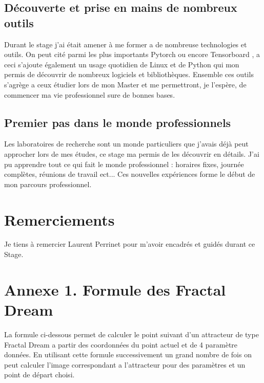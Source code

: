 \documentclass[11pt,francais]{article}
\begin{document}
\subsection{Découverte et prise en mains de nombreux outils}
Durant le stage j'ai était amener à me former a de nombreuse technologies et outils.
On peut cité parmi les plus importants Pytorch \cite{paszke2017automatic} ou encore Tensorboard \cite{tensorflow2015-whitepaper}, a ceci s'ajoute également un usage quotidien de Linux et de Python qui mon permis de découvrir de nombreux logiciels et bibliothèques.
Ensemble ces outils s'agrège a ceux étudier lors de mon Master et me permettront, je l'espère, de commencer ma vie professionnel sure de bonnes bases.

\subsection{Premier pas dans le monde professionnels}
Les laboratoires de recherche sont un monde particuliers que j'avais déjà peut approcher lors de mes études, ce stage ma permis de les découvrir en détails. J'ai pu apprendre tout ce qui fait le monde professionnel : horaires fixes, journée complètes, réunions de travail ect...
Ces nouvelles expériences forme le début de mon parcours professionnel.

\newpage


\section*{Remerciements}
Je tiens à remercier Laurent Perrinet pour m'avoir encadrés et guidés durant ce Stage.



\newpage
\section*{Annexe 1. Formule des Fractal Dream}
\label{sec:annexe1}
La formule ci-dessous permet de calculer le point suivant d'un attracteur de type Fractal Dream a partir des coordonnées du point actuel et de 4 paramètre données.
En utilisant cette formule successivement un grand nombre de fois on peut calculer l'image correspondant a l'attracteur pour des paramètres et un point de départ choisi.  
\end{document}
